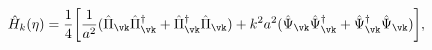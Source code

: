 \begin{equation}
\hat{H}_{k}(\eta) = \frac{1}{4} \biggl[\frac{1}{a^2}(\hat{\Pi}_{\vk} \hat{\Pi}^{\dagger}_{\vk} + 
\hat{\Pi}_{\vk}^{\dagger} \hat{\Pi}_{\vk}) + k^2 a^2(\hat{\Psi}_{\vk} \hat{\Psi}^{\dagger}_{\vk} + 
\hat{\Psi}_{\vk}^{\dagger} \hat{\Psi}_{\vk}) \biggr],
\label{H1k}
\end{equation}

